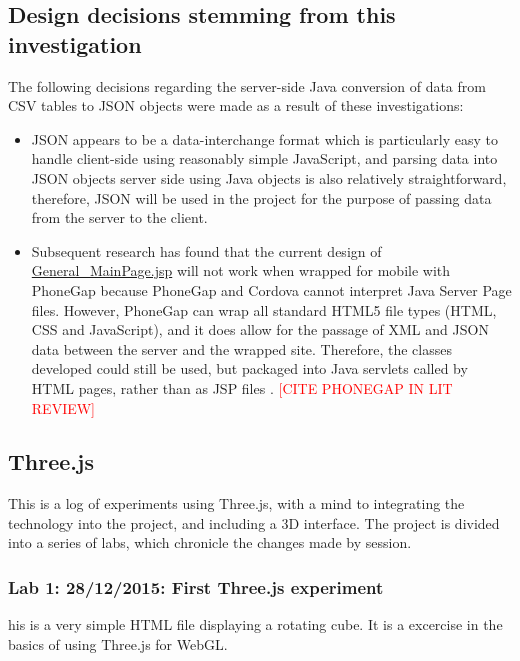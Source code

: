 \subsection{Design decisions stemming from this investigation}
\label{subSec: Java and JSON: Design decisions stemming from this investigation}

The following decisions regarding the server-side Java conversion of data from CSV tables to JSON objects were made as a result of these investigations:

\begin{itemize}
\item JSON appears to be a data-interchange format which is particularly easy to handle client-side using reasonably simple JavaScript, and parsing data into JSON objects server side using Java objects is also relatively straightforward, therefore, JSON will be used in the project for the purpose of passing data from the server to the client.

\item Subsequent research has found that the current design of \url{General_MainPage.jsp} will not work when wrapped for mobile with PhoneGap because PhoneGap and Cordova cannot interpret Java Server Page files. However, PhoneGap can wrap all standard HTML5 file types (HTML, CSS and JavaScript), and it does allow for the passage of XML and JSON data between the server and the wrapped site. Therefore, the classes developed could still be used, but packaged into Java servlets called by HTML pages, rather than as JSP files \cite{PhoneGap:FAQs}. \textcolor{red}{[CITE PHONEGAP IN LIT REVIEW]}
\end{itemize}

\subsection{Three.js}
\label{subSec:Three.js}
This is a log of experiments using Three.js, with a mind to integrating the technology into the project, and including a 3D interface. The project is divided into a series of labs, which chronicle the changes made by session.

\subsubsection{Lab 1: 28/12/2015: First Three.js experiment}
\label{subSubSec:ThreeJSExperiments:Lab1}
his is a very simple HTML file displaying a rotating cube. It is a excercise in the basics of using Three.js for WebGL.

